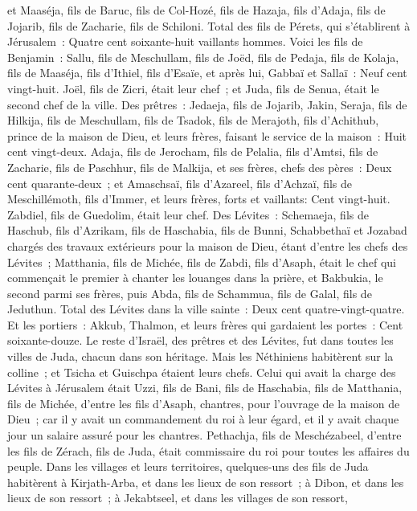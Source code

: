 \begin{multicols}{2}
et Maaséja, fils de Baruc, fils de Col-Hozé, fils de Hazaja, fils d'Adaja, fils de Jojarib, fils de Zacharie, fils de Schiloni.
Total des fils de Pérets, qui s'établirent à Jérusalem~: Quatre cent soixante-huit vaillants hommes.
Voici les fils de Benjamin~: Sallu, fils de Meschullam, fils de Joëd, fils de Pedaja, fils de Kolaja, fils de Maaséja, fils d'Ithiel, fils d'Esaïe,
et après lui, Gabbaï et Sallaï~: Neuf cent vingt-huit.
Joël, fils de Zicri, était leur chef~; et Juda, fils de Senua, était le second chef de la ville.
Des prêtres~: Jedaeja, fils de Jojarib, Jakin,
Seraja, fils de Hilkija, fils de Meschullam, fils de Tsadok, fils de Merajoth, fils d'Achithub, prince de la maison de Dieu,
et leurs frères, faisant le service de la maison~: Huit cent vingt-deux. Adaja, fils de Jerocham, fils de Pelalia, fils d'Amtsi, fils de Zacharie, fils de Paschhur, fils de Malkija,
et ses frères, chefs des pères~: Deux cent quarante-deux~; et Amaschsaï, fils d'Azareel, fils d'Achzaï, fils de Meschillémoth, fils d'Immer,
et leurs frères, forts et vaillants: Cent vingt-huit. Zabdiel, fils de Guedolim, était leur chef.
Des Lévites~: Schemaeja, fils de Haschub, fils d'Azrikam, fils de Haschabia, fils de Bunni,
Schabbethaï et Jozabad chargés des travaux extérieurs pour la maison de Dieu, étant d'entre les chefs des Lévites~;
Matthania, fils de Michée, fils de Zabdi, fils d'Asaph, était le chef qui commençait le premier à chanter les louanges dans la prière, et Bakbukia, le second parmi ses frères, puis Abda, fils de Schammua, fils de Galal, fils de Jeduthun.
Total des Lévites dans la ville sainte~: Deux cent quatre-vingt-quatre.
Et les portiers~: Akkub, Thalmon, et leurs frères qui gardaient les portes~: Cent soixante-douze.
Le reste d'Israël, des prêtres et des Lévites, fut dans toutes les villes de Juda, chacun dans son héritage.
Mais les Néthiniens habitèrent sur la colline~; et Tsicha et Guischpa étaient leurs chefs.
Celui qui avait la charge des Lévites à Jérusalem était Uzzi, fils de Bani, fils de Haschabia, fils de Matthania, fils de Michée, d'entre les fils d'Asaph, chantres, pour l'ouvrage de la maison de Dieu~;
car il y avait un commandement du roi à leur égard, et il y avait chaque jour un salaire assuré pour les chantres.
Pethachja, fils de Meschézabeel, d'entre les fils de Zérach, fils de Juda, était commissaire du roi pour toutes les affaires du peuple.
Dans les villages et leurs territoires, quelques-uns des fils de Juda habitèrent à Kirjath-Arba, et dans les lieux de son ressort~; à Dibon, et dans les lieux de son ressort~; à Jekabtseel, et dans les villages de son ressort,

\end{multicols}
